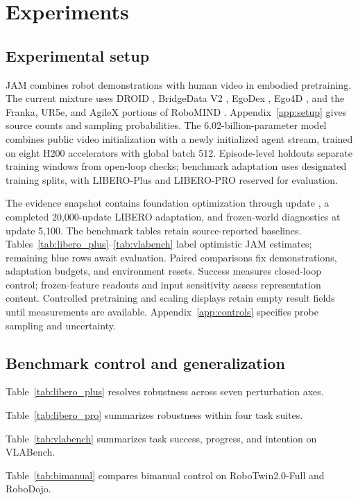 \FloatBarrier
\setlength{\intextsep}{6pt}
\section{Experiments}
\label{sec:experiments}
\subsection{Experimental setup}
JAM combines robot demonstrations with human video in embodied pretraining. The current mixture
uses DROID \citep{droid}, BridgeData V2 \citep{bridge}, EgoDex \citep{egodex}, Ego4D \citep{ego4d}, and the
Franka, UR5e, and AgileX portions of RoboMIND \citep{robomind}. Appendix~\ref{app:setup} gives
source counts and sampling probabilities. The 6.02-billion-parameter model combines public video
initialization with a newly initialized agent stream, trained on eight H200 accelerators with
global batch 512. Episode-level holdouts separate training windows from open-loop checks;
benchmark adaptation uses designated training splits, with LIBERO-Plus and LIBERO-PRO reserved
for evaluation.

The evidence snapshot contains foundation optimization through update \FoundationSteps{}, a
completed 20,000-update LIBERO adaptation, and frozen-world diagnostics at update 5,100.
The benchmark tables retain source-reported baselines. Tables~\ref{tab:libero_plus}--\ref{tab:vlabench}
label optimistic JAM estimates; remaining blue rows await evaluation. Paired comparisons fix
demonstrations, adaptation budgets, and environment resets.
Success measures closed-loop control; frozen-feature readouts and input sensitivity assess
representation content. Controlled pretraining and scaling displays retain empty result fields
until measurements are available. Appendix~\ref{app:controls} specifies probe sampling and uncertainty.

\subsection{Benchmark control and generalization}
Table~\ref{tab:libero_plus} resolves robustness across seven perturbation axes.

\FloatBarrier
Table~\ref{tab:libero_pro} summarizes robustness within four task suites.


Table~\ref{tab:vlabench} summarizes task success, progress, and intention on VLABench.

Table~\ref{tab:bimanual} compares bimanual control on RoboTwin2.0-Full and RoboDojo.


